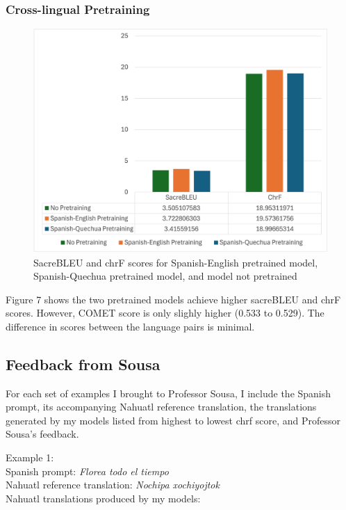 \documentclass[10pt,twocolumn]{article}
\begin{document}
\subsubsection{Cross-lingual Pretraining}
\begin{figure}
    \centering
    \includegraphics[width=.95\linewidth]{Pretraining.png}
    \caption{
        SacreBLEU and chrF scores for Spanish-English pretrained model, Spanish-Quechua pretrained model, and model not pretrained
    }
    \label{fig:first-page}
\end{figure}
Figure 7 shows the two pretrained models achieve higher sacreBLEU and chrF scores. However, COMET score is only slighly higher (0.533 to 0.529). The difference in scores between the language pairs is minimal. 

\subsection{Feedback from Sousa}
For each set of examples I brought to Professor Sousa, I include the Spanish prompt, its accompanying Nahuatl reference translation,  the translations generated by my models listed from highest to lowest chrf score, and Professor Sousa's feedback.

Example 1: \\
    Spanish prompt: \textit{Florea todo el tiempo} \\
    Nahuatl reference translation: \textit {Nochipa xochiyojtok} \\
    Nahuatl translations produced by my models:
    
\end{document}

